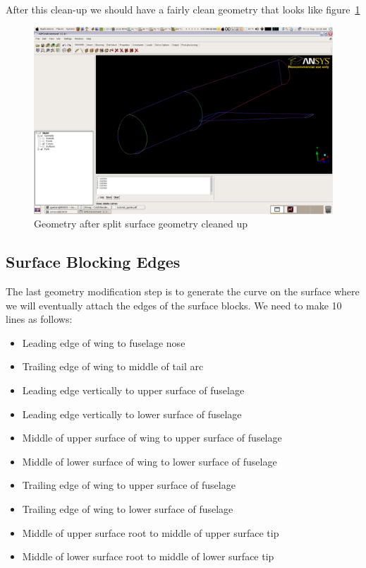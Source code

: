 \documentclass{report}
\begin{document}
After this clean-up we should have a fairly clean geometry that looks like figure~\ref{fig:cleaned_up_geo}
\begin{figure}[htb]
  \centering
  \includegraphics[width=\textwidth,angle=0]{figures/fig4.png}
  \caption{Geometry after split surface geometry cleaned up}
  \label{fig:cleaned_up_geo}
\end{figure}

\subsection{Surface Blocking Edges}
The last geometry modification step is to generate the curve on the surface where we will eventually attach the edges of the surface blocks.  We need to make 10 lines as follows:

\begin{itemize}
\item Leading edge of wing to fuselage nose
\item Trailing edge of wing to middle of tail arc
\item Leading edge vertically to upper surface of fuselage
\item Leading edge vertically to lower surface of fuselage
\item Middle of upper surface of wing to upper surface of fuselage
\item Middle of lower surface of wing to lower surface of fuselage
\item Trailing edge of wing to upper surface of fuselage
\item Trailing edge of wing to lower surface of fuselage
\item Middle of upper surface root to middle of upper surface tip
\item Middle of lower surface root to middle of lower surface tip
\end{itemize}
\end{document}
